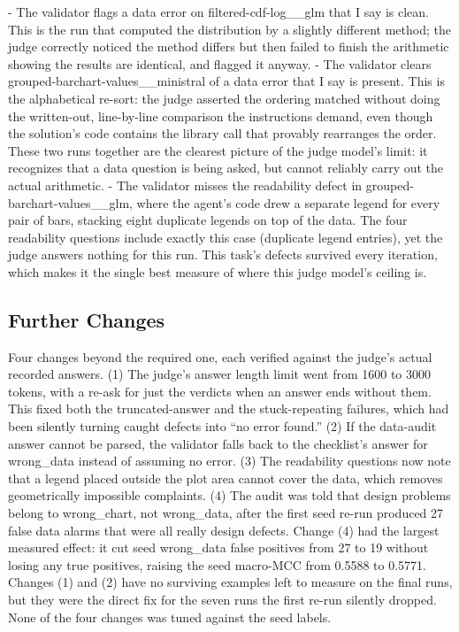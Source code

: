 \documentclass[11pt]{article}
\begin{document}
- The validator flags a data error on filtered-cdf-log\_\_glm that I say is clean. This is the run that computed the distribution by a slightly different method; the judge correctly noticed the method differs but then failed to finish the arithmetic showing the results are identical, and flagged it anyway.
- The validator clears grouped-barchart-values\_\_ministral of a data error that I say is present. This is the alphabetical re-sort: the judge asserted the ordering matched without doing the written-out, line-by-line comparison the instructions demand, even though the solution's code contains the library call that provably rearranges the order. These two runs together are the clearest picture of the judge model's limit: it recognizes that a data question is being asked, but cannot reliably carry out the actual arithmetic.
- The validator misses the readability defect in grouped-barchart-values\_\_glm, where the agent's code drew a separate legend for every pair of bars, stacking eight duplicate legends on top of the data. The four readability questions include exactly this case (duplicate legend entries), yet the judge answers nothing for this run. This task's defects survived every iteration, which makes it the single best measure of where this judge model's ceiling is.

\subsection{Further Changes}

Four changes beyond the required one, each verified against the judge's actual recorded answers. (1) The judge's answer length limit went from 1600 to 3000 tokens, with a re-ask for just the verdicts when an answer ends without them. This fixed both the truncated-answer and the stuck-repeating failures, which had been silently turning caught defects into ``no error found.'' (2) If the data-audit answer cannot be parsed, the validator falls back to the checklist's answer for wrong\_data instead of assuming no error. (3) The readability questions now note that a legend placed outside the plot area cannot cover the data, which removes geometrically impossible complaints. (4) The audit was told that design problems belong to wrong\_chart, not wrong\_data, after the first seed re-run produced 27 false data alarms that were all really design defects. Change (4) had the largest measured effect: it cut seed wrong\_data false positives from 27 to 19 without losing any true positives, raising the seed macro-MCC from 0.5588 to 0.5771. Changes (1) and (2) have no surviving examples left to measure on the final runs, but they were the direct fix for the seven runs the first re-run silently dropped. None of the four changes was tuned against the seed labels.
\end{document}
